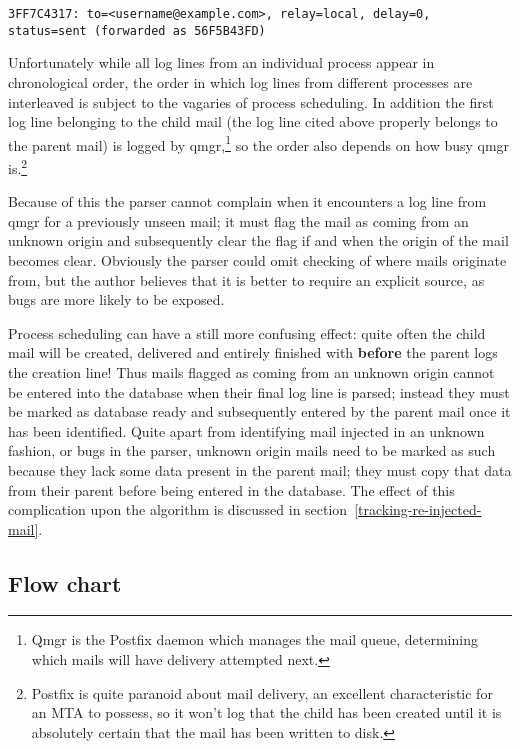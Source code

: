 \documentclass[a4paper,12pt,draft]{article}
\begin{document}
\texttt{3FF7C4317: to=<username@example.com>, relay=local, \newline 
delay=0, status=sent (forwarded as 56F5B43FD)}

Unfortunately while all log lines from an individual process appear in
chronological order, the order in which log lines from different processes
are interleaved is subject to the vagaries of process scheduling.  In
addition the first log line belonging to the child mail (the log line cited
above properly belongs to the parent mail) is logged by qmgr,\footnote{Qmgr
is the Postfix daemon which manages the mail queue, determining which mails
will have delivery attempted next.} so the order also depends on how busy
qmgr is.\footnote{Postfix is quite paranoid about mail delivery, an
excellent characteristic for an MTA to possess, so it won't log that the
child has been created until it is absolutely certain that the mail has
been written to disk.}

Because of this the parser cannot complain when it encounters a log line
from qmgr for a previously unseen mail; it must flag the mail as coming
from an unknown origin and subsequently clear the flag if and when the
origin of the mail becomes clear.  Obviously the parser could omit checking
of where mails originate from, but the author believes that it is better to
require an explicit source, as bugs are more likely to be exposed.

Process scheduling can have a still more confusing effect: quite often the
child mail will be created, delivered and entirely finished with
\textbf{before} the parent logs the creation line!  Thus mails flagged as
coming from an unknown origin cannot be entered into the database when
their final log line is parsed; instead they must be marked as database
ready and subsequently entered by the parent mail once it has been
identified.  Quite apart from identifying mail injected in an unknown
fashion, or bugs in the parser, unknown origin mails need to be marked as
such because they lack some data present in the parent mail; they must copy
that data from their parent before being entered in the database.
The effect of this complication upon the algorithm is discussed in
section~\ref{tracking-re-injected-mail}.



\newpage
\subsection{Flow chart}
\end{document}
